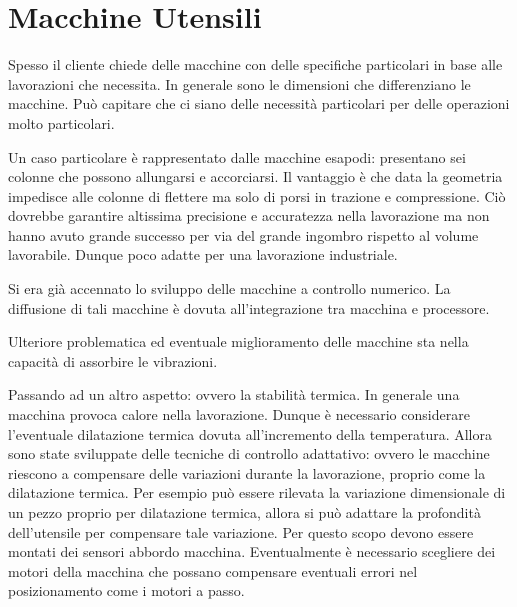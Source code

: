 \chapter{Macchine Utensili}\label{chp:MacchineUtensili}
Spesso il cliente chiede delle macchine con delle specifiche particolari
in base alle lavorazioni che necessita.
In generale sono le dimensioni che differenziano le macchine.
Può capitare che ci siano delle necessità particolari per delle operazioni 
molto particolari.

Un caso particolare è rappresentato dalle macchine esapodi: presentano sei colonne che possono allungarsi e accorciarsi. Il vantaggio è che data la geometria impedisce alle colonne di flettere ma solo di porsi in trazione e compressione.
Ciò dovrebbe garantire altissima precisione e accuratezza nella lavorazione ma non hanno avuto grande successo per via del grande ingombro rispetto al volume lavorabile. Dunque poco adatte per una lavorazione industriale.

Si era già accennato lo sviluppo delle macchine a controllo numerico.
La diffusione di tali macchine è dovuta all'integrazione tra macchina e 
processore.

Ulteriore problematica ed eventuale miglioramento delle macchine sta nella capacità di assorbire le vibrazioni.

Passando ad un altro aspetto: ovvero la stabilità termica.
In generale una macchina provoca calore nella lavorazione. Dunque è necessario considerare l'eventuale dilatazione termica dovuta all'incremento della temperatura.
Allora sono state sviluppate delle tecniche di controllo adattativo: ovvero le macchine riescono a compensare delle variazioni durante la lavorazione, proprio come la dilatazione termica. 
Per esempio può essere rilevata la variazione dimensionale di un pezzo proprio per dilatazione termica, allora si può adattare la profondità dell'utensile per compensare tale variazione. 
Per questo scopo devono essere montati dei sensori abbordo macchina.
Eventualmente è necessario scegliere dei motori della macchina che possano compensare eventuali errori nel posizionamento come i motori a passo.

